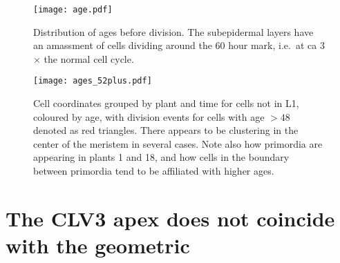 \begin{figure}[H]
  \centering
  \texttt{[image: age.pdf]}
  \caption[Layer-wise age distribution]{Distribution of ages before division. The subepidermal layers have an
    amassment of cells dividing around the 60 hour mark, i.e.\ at ca 3$\times$
    the normal cell cycle.}
  \label{fig:age}
\end{figure}

\begin{figure}[H]
  \centering
  \texttt{[image: ages\_52plus.pdf]}
  \caption[Clustering of high-longevity cells]{Cell coordinates grouped by plant and time for cells not in L1, coloured by age, with division events for cells with
    age $>48$ denoted as red triangles. There appears to be clustering in the
    center of the meristem in several cases. Note also how primordia are appearing in plants 1
    and 18, and how cells in the boundary between primordia tend to be
    affiliated with higher ages.}
  \label{fig:ages}
\end{figure}

\section{The CLV3 apex does not coincide with the geometric}

